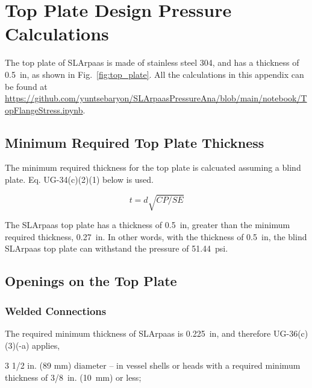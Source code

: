 \section{Top Plate Design Pressure Calculations}
\label{app:top_plate}

The top plate of SLArpaas is made of stainless steel 304, and has
a thickness of 0.5~in, as shown in Fig.~\ref{fig:top_plate}.
All the calculations in this appendix can be found
at \url{https://github.com/yuntsebaryon/SLArpaasPressureAna/blob/main/notebook/TopFlangeStress.ipynb}.

\subsection{Minimum Required Top Plate Thickness}
\label{app:blind_flange}

The minimum required thickness for the top plate is calcuated assuming
a blind plate.  Eq. UG-34(c)(2)(1) below is used.

\begin{equation}
    t= d\sqrt{CP/SE}
\end{equation}



The SLArpaas top plate has a thickness of 0.5~in, greater than the minimum
required thickness, 0.27~in.
In other words, with the thickness of 0.5~in, the blind SLArpaas top plate
can withstand the pressure of 51.44~psi.

\subsection{Openings on the Top Plate}
\label{app:openings}

\subsubsection{Welded Connections}
\label{app:welded}

The required minimum thickness of SLArpaas is 0.225~in, and therefore
UG-36(c)(3)(-a) applies,

\begin{displayquote}
    3 1/2 in. (89 mm) diameter -- in vessel shells or heads with a 
    required minimum thickness of 3/8~in. (10~mm) or less;
\end{displayquote}

